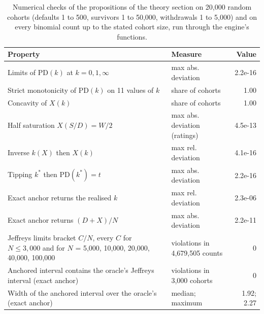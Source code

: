 \begin{table}[htbp]
\centering
\small
\caption{Numerical checks of the propositions of the theory section on 20,000 random cohorts (defaults 1 to 500, survivors 1 to 50,000, withdrawals 1 to 5,000) and on every binomial count up to the stated cohort size, run through the engine's functions.}
\label{tab:theory-checks}
\begin{tabular}{p{6.6cm}p{4.4cm}r}
\toprule
Property & Measure & Value \\
\midrule
\relax Limits of PD$(k)$ at $k=0,1,\infty$ & max abs. deviation & 2.2e-16 \\
\relax Strict monotonicity of PD$(k)$ on 11 values of $k$ & share of cohorts & 1.00 \\
\relax Concavity of $X(k)$ & share of cohorts & 1.00 \\
\relax Half saturation $X(S/D)=W/2$ & max abs. deviation (ratings) & 4.5e-13 \\
\relax Inverse $k(X)$ then $X(k)$ & max rel. deviation & 4.1e-16 \\
\relax Tipping $k^*$ then PD$(k^*)=t$ & max abs. deviation & 2.2e-16 \\
\relax Exact anchor returns the realised $k$ & max rel. deviation & 2.3e-06 \\
\relax Exact anchor returns $(D+X)/N$ & max abs. deviation & 2.2e-11 \\
\relax Jeffreys limits bracket $C/N$, every $C$ for $N\le3,000$ and for $N$ = 5,000, 10,000, 20,000, 40,000, 100,000 & violations in 4,679,505 counts & 0 \\
Anchored interval contains the oracle's Jeffreys interval (exact anchor) & violations in 3,000 cohorts & 0 \\
Width of the anchored interval over the oracle's (exact anchor) & median; maximum & 1.92; 2.27 \\
\bottomrule
\end{tabular}
\end{table}
